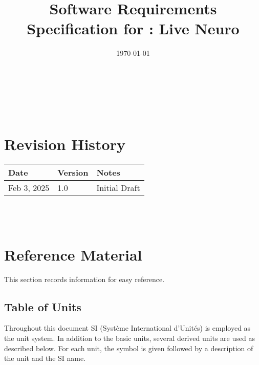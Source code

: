 \documentclass[12pt]{article}
\begin{document}
\title{Software Requirements Specification for \progname: Live Neuro}
\author{\authname}
\date{\today}
	
\maketitle

~\newpage


\tableofcontents

~\newpage

\section*{Revision History}

\begin{tabularx}{\textwidth}{p{3cm}p{2cm}X}
\toprule {\bf Date} & {\bf Version} & {\bf Notes}\\
\midrule
Feb 3, 2025 & 1.0 & Initial Draft\\
\bottomrule
\end{tabularx}

~\\

~\newpage

\section{Reference Material}

This section records information for easy reference.

\subsection{Table of Units}

Throughout this document SI (Syst\`{e}me International d'Unit\'{e}s) is employed
as the unit system.  In addition to the basic units, several derived units are
used as described below.  For each unit, the symbol is given followed by a
description of the unit and the SI name.
~\newline
\end{document}
